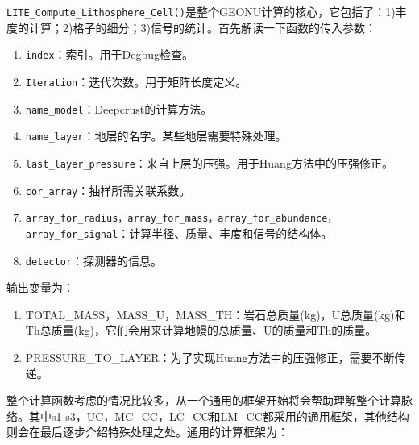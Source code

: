 			\texttt{LITE\_Compute\_Lithosphere\_Cell()}是整个GEONU计算的核心，它包括了：1)丰度的计算；2)格子的细分；3)信号的统计。首先解读一下函数的传入参数：
				\begin{enumerate}
					\item \texttt{index}：索引。用于Degbug检查。
					\item \texttt{Iteration}：迭代次数。用于矩阵长度定义。
					\item \texttt{name\_model}：Deepcrust的计算方法。
					\item \texttt{name\_layer}：地层的名字。某些地层需要特殊处理。
					\item \texttt{last\_layer\_pressure}：来自上层的压强。用于Huang方法中的压强修正。
					\item \texttt{cor\_array}：抽样所需关联系数。
					\item \texttt{array\_for\_radius，array\_for\_mass，array\_for\_abundance，array\_for\_signal}：计算半径、质量、丰度和信号的结构体。
					\item \texttt{detector}：探测器的信息。
				\end{enumerate}
			输出变量为：
				\begin{enumerate}
					\item TOTAL\_MASS，MASS\_U，MASS\_TH：岩石总质量(kg)，U总质量(kg)和Th总质量(kg)，它们会用来计算地幔的总质量、U的质量和Th的质量。
					\item PRESSURE\_TO\_LAYER：为了实现Huang方法中的压强修正，需要不断传递。
				\end{enumerate}
			整个计算函数考虑的情况比较多，从一个通用的框架开始将会帮助理解整个计算脉络。其中s1-s3，UC，MC\_CC，LC\_CC和LM\_CC都采用的通用框架，其他结构则会在最后逐步介绍特殊处理之处。通用的计算框架为：
